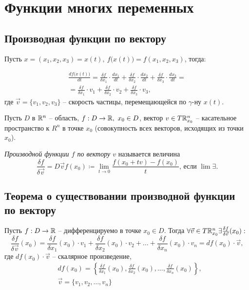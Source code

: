 \section{Функции многих переменных}

\subsection{Производная функции по вектору}

\begin{note}
    Пусть $ x = (x_1,x_2,x_3) = x(t), \ f\big(x(t)\big) = f(x_1,x_2,x_3)$, тогда:

    \begin{multline*}
        \frac{df\big(x(t)\big)}{dt} = \frac{\delta f}{\delta x_1} \cdot \frac{dx_1}{dt} + \frac{\delta f}{\delta x_2} \cdot \frac{dx_2}{dt} + \frac{\delta f}{\delta x_3} \cdot \frac{dx_3}{dt} = \\
        = \frac{\delta f}{\delta x_1} \cdot v_1 + \frac{\delta f}{\delta x_2} \cdot v_2 + \frac{\delta f}{\delta x_3} \cdot v_3,
    \end{multline*}
    где $\vec{v} = \{v_1,v_2,v_3\}$ -- скорость частицы, перемещающейся по $\gamma$-ну $x(t)$.
\end{note}

\begin{definition}
    Пусть $ D $ в $ \mathbb{R}^n $ -- область, $ f:D\rightarrow \mathbb{R}, \ x_0 \in D $, вектор $ v\in T\mathbb{R}_{x_0}^n $ -- касательное пространство к $ R^n $ в точке $ x_0 $ (совокупность всех векторов, исходящих из точки $ x_0 $).

    \emph{Производной функции $ f $ по вектору $ v $} называется величина
    \[
        \frac{\delta f}{\delta \vec{v}} = D \vec{v} f(x_0) \coloneqq \underset{t \rightarrow 0}{\lim}\frac{f(x_0 + tv) - f(x_0)}{t}\text{, если }\lim \exists.
    \]
\end{definition}

\subsection{Теорема о существовании производной функции по вектору}

\begin{statement}
    Пусть $ f:D\rightarrow\mathbb{R} $ -- дифференцируемо в точке $ x_0\in D $. Тогда $ \forall \vec{v}\in T\mathbb{R}_{x_0}^n \exists \frac{\delta f}{\delta \vec{v}}(x_0):$
    \[
        \frac{\delta f}{\delta \vec{v}}(x_0) = \frac{\delta f}{\delta x_1}(x_0) \cdot v_1 + \frac{\delta f}{\delta x_2}(x_0) \cdot v_2 + \ldots +\frac{\delta f}{\delta x_n}(x_0) \cdot v_n = df(x_0)\cdot \vec{v},
    \] где $df(x_0)\cdot \vec{v}$ -- скалярное произведение,
    \begin{align*}
         & df(x_0) = \left\{\frac{\delta f}{\delta x_1}(x_0), \frac{\delta f}{\delta x_2}(x_0), \ldots, \frac{\delta f}{\delta x_n}(x_0)\right\}, \\
         & \vec{v} = \{v_1,v_2,\ldots,v_n\}
    \end{align*}
\end{statement}

